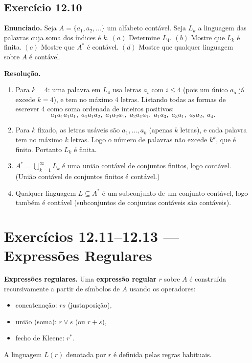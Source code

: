 \documentclass[12pt,a4paper]{article}
\newcommand{\keyword}[1]{\textbf{\textcolor{azul}{#1}}}
\begin{document}
\subsection*{Exercício 12.10}

\textbf{Enunciado.} Seja $A = \{a_1, a_2, \ldots\}$ um alfabeto contável. Seja $L_k$
a linguagem das palavras cuja soma dos índices é $k$.
$(a)$ Determine $L_4$.
$(b)$ Mostre que $L_k$ é finita.
$(c)$ Mostre que $A^*$ é contável.
$(d)$ Mostre que qualquer linguagem sobre $A$ é contável.

\medskip
\textbf{Resolução.}

\begin{enumerate}[label=(\alph*)]
  \item Para $k=4$: uma palavra em $L_4$ usa letras $a_i$ com $i \le 4$
        (pois um único $a_5$ já excede $k=4$), e tem no máximo 4 letras.
        Listando todas as formas de escrever 4 como soma ordenada de inteiros positivos:
        \[
          a_1a_1a_1a_1,\; a_1a_1a_2,\; a_1a_2a_1,\; a_2a_1a_1,\;
          a_1a_3,\; a_3a_1,\; a_2a_2,\; a_4.
        \]

  \item Para $k$ fixado, as letras usáveis são $a_1, \ldots, a_k$ (apenas $k$ letras),
        e cada palavra tem no máximo $k$ letras. Logo o número de palavras não excede
        $k^k$, que é finito. Portanto $L_k$ é finita.

  \item $A^* = \bigcup_{k=1}^{\infty} L_k$ é uma união contável de conjuntos finitos,
        logo contável. (União contável de conjuntos finitos é contável.)

  \item Qualquer linguagem $L \subseteq A^*$ é um subconjunto de um conjunto contável,
        logo também é contável (subconjuntos de conjuntos contáveis são contáveis).
\end{enumerate}

\section*{Exercícios 12.11--12.13 — Expressões Regulares}

\begin{teoriacaixa}
\textbf{Expressões regulares.} Uma \keyword{expressão regular} $r$ sobre $A$ é construída
recursivamente a partir de símbolos de $A$ usando os operadores:
\begin{itemize}[noitemsep]
  \item concatenação: $rs$ (justaposição),
  \item união (soma): $r \vee s$ (ou $r + s$),
  \item fecho de Kleene: $r^*$.
\end{itemize}
A linguagem $L(r)$ denotada por $r$ é definida pelas regras habituais.
\end{teoriacaixa}
\end{document}
